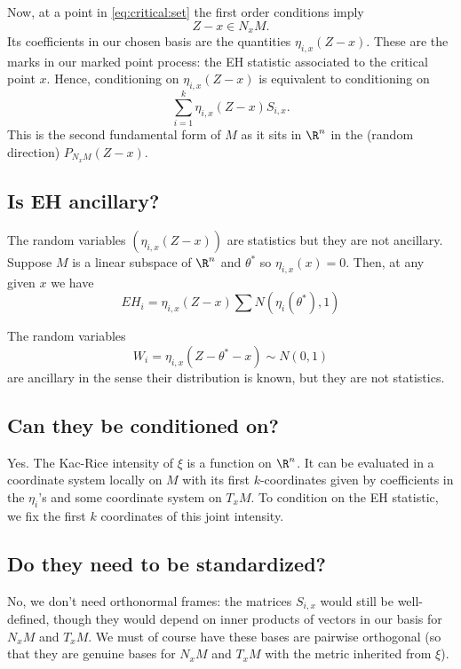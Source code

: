 \documentclass{article}
\begin{document}
Now, at a point in \eqref{eq:critical:set} the first order conditions imply
$$
Z-x \in N_xM.
$$
Its coefficients in our chosen basis are the quantities $\eta_{i,x}(Z-x)$. These are the marks
in our marked point process: the EH statistic associated to the critical point $x$. Hence, conditioning on $\eta_{i,x}(Z-x)$ is equivalent to conditioning on 
$$
\sum_{i=1}^k \eta_{i,x}(Z-x) S_{i,x}.
$$
This is the second fundamental form of $M$ as it sits in $\R^n$ in the (random direction) $P_{N_xM}(Z-x)$.

\subsection{Is EH ancillary?}

The random variables $(\eta_{i,x}(Z-x))$ are statistics but they are not ancillary.
Suppose $M$ is a linear subspace of $\R^n$ and $\theta^*$ so $\eta_{i,x}(x)=0$.
Then, at any given $x$ we have
$$
EH_i = \eta_{i,x}(Z-x) \sum N(\eta_i(\theta^*), 1)
$$

The random variables
$$
W_i = \eta_{i,x}(Z-\theta^*-x) \sim N(0, 1)
$$
are ancillary in the sense their distribution is known, but they are not statistics.

\subsection{Can they be conditioned on?}

Yes. The Kac-Rice intensity of $\xi$ is a function on $\R^n$. It can be evaluated in
a coordinate system locally on $M$ with its first $k$-coordinates given by coefficients
in the $\eta_i$'s and some coordinate system on $T_xM$. To condition on the
EH statistic, we fix the first $k$ coordinates of this joint intensity.

\subsection{Do they need to be standardized?}

No, we don't need orthonormal frames: the matrices $S_{i,x}$ would still be well-defined, though they would depend on inner products of vectors in our basis for $N_xM$ and $T_xM$. We must of course have these bases are pairwise orthogonal (so that they are genuine bases for $N_xM$ and $T_xM$ with the metric inherited from $\xi$).
\end{document}
